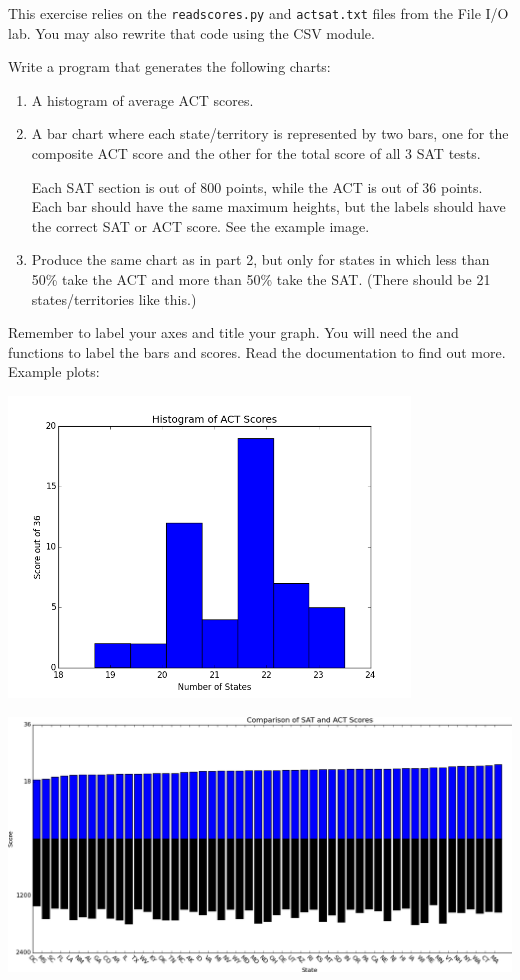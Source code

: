 \documentclass[11pt]{cselabheader}
\begin{document}
\begin{ex}[plotscores.py]
  This exercise relies on the \texttt{readscores.py} and
\texttt{actsat.txt} files from the File I/O lab. You may also rewrite
that code using the CSV module.

  Write a program that generates the following charts:
  \begin{enumerate}
    \item A histogram of average ACT scores.
    \item A bar chart where each state/territory is represented by two
      bars, one for the composite ACT score and the other for the total
      score of all 3 SAT tests.

      Each SAT section is out of 800 points, while the ACT is out of
      36 points. Each bar should have the same maximum heights, but the
      labels should have the correct SAT or ACT score. See the example
      image.
    \item Produce the same chart as in part 2, but only for states in which
      less than 50\% take the ACT and more than 50\% take the SAT. (There
      should be 21 states/territories like this.)
  \end{enumerate}

  Remember to label your axes and title your graph.  You will need the
   and 
  functions to label the bars and scores. Read the documentation to
  find out more. Example plots:

  \begin{center}
  \includegraphics[width=0.8\textwidth]{img/actsat_hist.png}

  \includegraphics[width=\textwidth]{img/actsat_bars_all.png}
  \end{center}
\end{ex}
\end{document}
